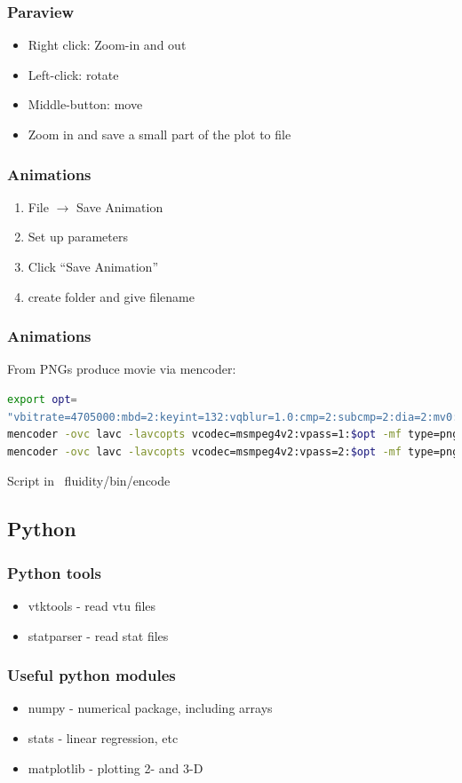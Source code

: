 \documentclass[12pt]{beamer}
\begin{document}
\begin{frame}
    \frametitle{Paraview}
\begin{itemize}
\item Right click: Zoom-in and out
\item Left-click: rotate
\item Middle-button: move
\item Zoom in and save a small part of the plot to file
\end{itemize}
\end{frame}

\begin{frame}
	\frametitle{Animations}
\begin{enumerate}
\item File $\rightarrow$ Save Animation
\item Set up parameters
\item Click ``Save Animation''
\item create folder and give filename
\end{enumerate}
\end{frame}

\begin{frame}[fragile]
	\frametitle{Animations}
From PNGs produce movie via mencoder:
\vspace{5mm}
\begin{lstlisting}[language=bash]
export opt=
"vbitrate=4705000:mbd=2:keyint=132:vqblur=1.0:cmp=2:subcmp=2:dia=2:mv0:last_pred=3"
mencoder -ovc lavc -lavcopts vcodec=msmpeg4v2:vpass=1:$opt -mf type=png:fps=10 -nosound -o /dev/null mf://*.png
mencoder -ovc lavc -lavcopts vcodec=msmpeg4v2:vpass=2:$opt -mf type=png:fps=10 -nosound -o output.avi mf://*.png
\end{lstlisting}
\vspace{5mm}
Script in ~fluidity/bin/encode
\end{frame}

\subsection{Python}
\begin{frame}
    \frametitle{Python tools}
\begin{itemize}
\item vtktools - read vtu files 
\item statparser - read stat files
\end{itemize}
\end{frame}

\begin{frame}
    \frametitle{Useful python modules}
\begin{itemize}
\item numpy - numerical package, including arrays
\item stats - linear regression, etc
\item matplotlib - plotting 2- and 3-D
\end{itemize}
\end{frame}
\end{document}
